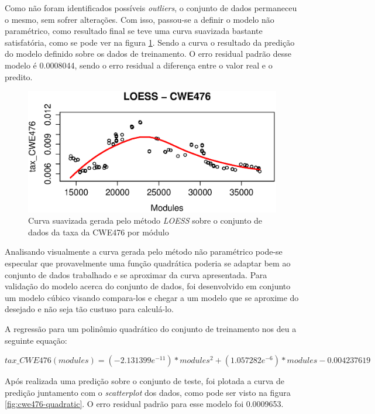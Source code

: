 Como não foram identificados possíveis \textit{outliers}, o conjunto de dados
permaneceu o mesmo, sem sofrer alterações. Com isso, passou-se a definir o
modelo não paramétrico, como resultado final se teve uma curva suavizada
bastante satisfatória, como se pode ver na figura \ref{fig:cwe476-loess}. Sendo
a curva o resultado da predição do modelo definido sobre os dados de
treinamento. O erro residual padrão desse modelo é 0.0008044, sendo o erro
residual a diferença entre o valor real e o predito.

\begin{figure}[h]
  \centering
  \includegraphics[width=1.0\textwidth]
      {figuras/cwe476-loess.eps}
      \caption{Curva suavizada gerada pelo método \textit{LOESS} sobre o
      conjunto de dados da taxa da CWE476 por módulo}
  \label{fig:cwe476-loess}
\end{figure}

Analisando visualmente a curva gerada pelo método não paramétrico pode-se
especular que provavelmente uma função quadrática poderia se adaptar bem ao
conjunto de dados trabalhado e se aproximar da curva apresentada. Para validação
do modelo acerca do conjunto de dados, foi desenvolvido em conjunto um modelo
cúbico visando compara-los e chegar a um modelo que se aproxime do desejado e
não seja tão custuso para calculá-lo. 

A regressão para um polinômio quadrático do conjunto de treinamento nos deu a
seguinte equação:

\begin{math}
 tax\_CWE476(modules) = (-2.131399e^{-11}) * modules^{2} + (1.057282e^{-6}) *
modules - 0.004237619 
\end{math}

Após realizada uma predição sobre o conjunto de teste, foi plotada a curva de
predição juntamento com o \textit{scatterplot} dos dados, como pode ser visto na
figura \ref{fig:cwe476-quadratic}. O erro residual padrão para esse modelo foi
0.0009653.

